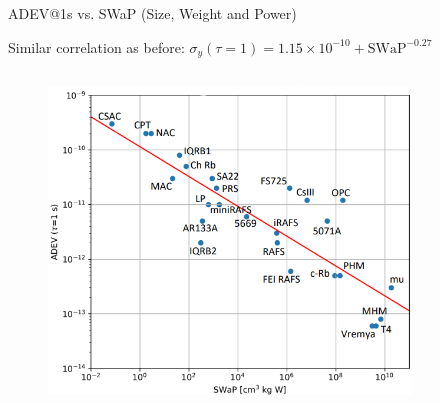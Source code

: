 \begin{frame}{ADEV@1s vs. SWaP (Size, Weight and Power)}

    Similar correlation as before\footnotemark[1]: $\sigma_y(\tau=1) = 1.15 \times 10^{-10} + \text{SWaP}^{-0.27}$

    \begin{columns}[c, onlytextwidth]

        \begin{column}{0.7\textwidth}

            \begin{figure}
                \centering
                \includegraphics[width=0.9\textwidth]{img/ADEV-vs-SWaP.png}
            \end{figure}

        \end{column}

        \begin{column}{0.3\textwidth}


\end{column}
\end{columns}
\end{frame}
